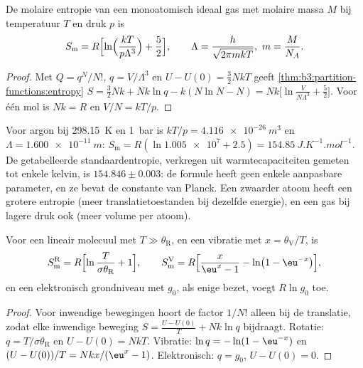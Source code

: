 \begin{theorem}\label{thm:b3:partition-functions:sackur-tetrode}
De molaire entropie van een monoatomisch ideaal gas met molaire massa $M$
bij temperatuur $T$ en druk $p$ is
\[
  S_{\mathrm m} = R\Bigl[\ln\Bigl(\frac{kT}{p\Lambda^3}\Bigr) + \frac52\Bigr],
  \qquad \Lambda = \frac{h}{\sqrt{2\pi mkT}},\ m = \frac{M}{N_A}.
\]
\end{theorem}

\begin{proof}
Met $Q = q^N/N!$, $q = V/\Lambda^3$ en $U - U(0) = \frac32NkT$ geeft
\cref{thm:b3:partition-functions:entropy} $S = \frac32Nk + Nk\ln q - k(N\ln N - N) =
Nk\bigl[\ln\frac{V}{N\Lambda^3} + \frac52\bigr]$. Voor één mol is $Nk = R$ en $V/N = kT/p$.
\end{proof}

Voor argon bij \qty{298.15}{K} en \qty{1}{bar} is $kT/p = \qty{4.116e-26}{m^3}$ en $\Lambda =
\qty{1.600e-11}{m}$: $S_{\mathrm m} = R(\ln\num{1.005e7} + 2.5) = \qty{154.85}{J.K^{-1}.mol^{-1}}$. De
getabelleerde standaardentropie, verkregen uit warmtecapaciteiten gemeten
tot enkele kelvin, is $154.846 \pm 0.003$: de formule heeft geen enkele
aanpasbare parameter, en ze bevat de constante van Planck. Een zwaarder
atoom heeft een grotere entropie (meer translatietoestanden bij dezelfde
energie), en een gas bij lagere druk ook (meer volume per atoom).

\begin{proposition}\label{prop:b3:partition-functions:modes-entropy}
Voor een lineair molecuul met $T \gg \theta_{\mathrm R}$, en een vibratie met $x = \theta_{\mathrm V}/T$, is
\[
  S^{\mathrm R}_{\mathrm m} = R\Bigl[\ln\frac{T}{\sigma\theta_{\mathrm R}} + 1\Bigr],
  \qquad
  S^{\mathrm V}_{\mathrm m} = R\Bigl[\frac{x}{\eu^x - 1} - \ln\bigl(1 - \eu^{-x}\bigr)\Bigr],
\]
en een elektronisch grondniveau met  $g_0$, als enige
bezet, voegt $R\ln g_0$ toe.
\end{proposition}

\begin{proof}
Voor inwendige bewegingen hoort de factor $1/N!$ alleen bij de translatie,
zodat elke inwendige beweging $S = \frac{U - U(0)}{T} + Nk\ln q$ bijdraagt.
Rotatie:
$q = T/\sigma\theta_{\mathrm R}$ en $U - U(0) = NkT$. Vibratie: $\ln q = -\ln(1 - \eu^{-x})$ en
$(U - U(0))/T = Nkx/(\eu^x - 1)$. Elektronisch: $q = g_0$, $U - U(0) = 0$.
\end{proof}


